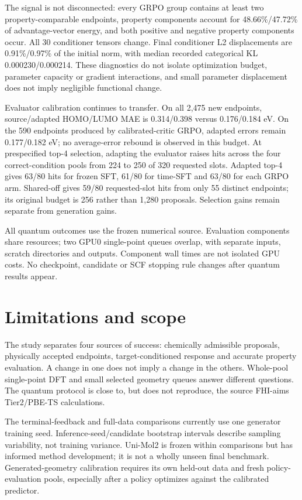 \documentclass[11pt,a4paper]{article}
\begin{document}
The signal is not disconnected: every GRPO group contains at least two
property-comparable endpoints, property components account for
48.66\%/47.72\% of advantage-vector energy, and both positive and
negative property components occur. All 30 conditioner tensors change.
Final conditioner L2 displacements are 0.91\%/0.97\% of the initial
norm, with median recorded categorical KL 0.000230/0.000214. These
diagnostics do not isolate optimization budget, parameter capacity or
gradient interactions, and small parameter displacement does not imply
negligible functional change.

Evaluator calibration continues to transfer. On all 2,475 new endpoints,
source/adapted HOMO/LUMO MAE is 0.314/0.398 versus 0.176/0.184 eV. On
the 590 endpoints produced by calibrated-critic GRPO, adapted errors
remain 0.177/0.182 eV; no average-error rebound is observed in this
budget. At prespecified top-4 selection, adapting the evaluator raises
hits across the four correct-condition pools from 224 to 250 of 320
requested slots. Adapted top-4 gives 63/80 hits for frozen SFT, 61/80
for time-SFT and 63/80 for each GRPO arm. Shared-off gives 59/80
requested-slot hits from only 55 distinct endpoints; its original budget
is 256 rather than 1,280 proposals. Selection gains remain separate from
generation gains.

All quantum outcomes use the frozen numerical source. Evaluation
components share resources; two GPU0 single-point queues overlap, with
separate inputs, scratch directories and outputs. Component wall times
are not isolated GPU costs. No checkpoint, candidate or SCF stopping
rule changes after quantum results appear.

\section{Limitations and scope}\label{limitations-and-scope}

The study separates four sources of success: chemically admissible
proposals, physically accepted endpoints, target-conditioned response
and accurate property evaluation. A change in one does not imply a
change in the others. Whole-pool single-point DFT and small selected
geometry queues answer different questions. The quantum protocol is
close to, but does not reproduce, the source FHI-aims Tier2/PBE-TS
calculations.

The terminal-feedback and full-data comparisons currently use one
generator training seed. Inference-seed/candidate bootstrap intervals
describe sampling variability, not training variance. Uni-Mol2 is frozen
within comparisons but has informed method development; it is not a
wholly unseen final benchmark. Generated-geometry calibration requires
its own held-out data and fresh policy-evaluation pools, especially
after a policy optimizes against the calibrated predictor.
\end{document}
